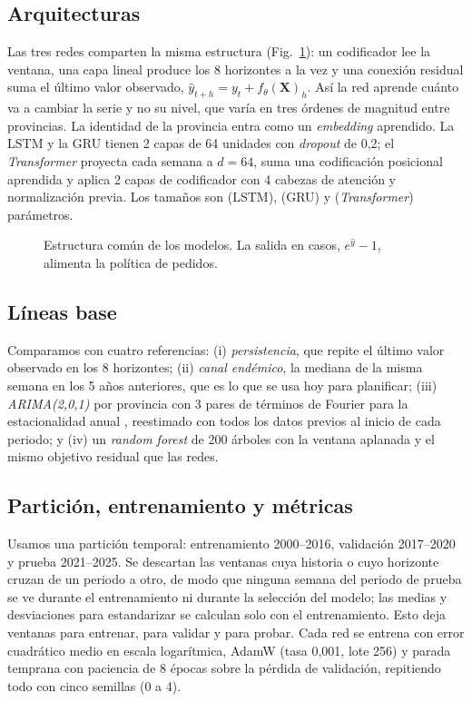 \documentclass[conference,a4paper]{IEEEtran}
\begin{document}
\subsection{Arquitecturas}
Las tres redes comparten la misma estructura (Fig.~\ref{fig:arq}): un codificador lee la ventana, una capa lineal produce los 8 horizontes a la vez y una conexión residual suma el último valor observado, $\hat{y}_{t+h}=y_t+f_\theta(\mathbf{X})_h$. Así la red aprende cuánto va a cambiar la serie y no su nivel, que varía en tres órdenes de magnitud entre provincias. La identidad de la provincia entra como un \textit{embedding} aprendido. La LSTM y la GRU tienen 2 capas de 64 unidades con \textit{dropout} de 0,2; el \textit{Transformer} proyecta cada semana a $d=64$, suma una codificación posicional aprendida y aplica 2 capas de codificador con 4 cabezas de atención y normalización previa. Los tamaños son \nPLS{} (LSTM), \nPGR{} (GRU) y \nPTr{} (\textit{Transformer}) parámetros.

\begin{figure}[t]
\centering

\caption{Estructura común de los modelos. La salida en casos, $e^{\hat y}-1$, alimenta la política de pedidos.}\label{fig:arq}
\end{figure}

\subsection{Líneas base}
Comparamos con cuatro referencias: (i) \emph{persistencia}, que repite el último valor observado en los 8 horizontes; (ii) \emph{canal endémico}, la mediana de la misma semana en los 5 años anteriores, que es lo que se usa hoy para planificar; (iii) \emph{ARIMA(2,0,1)} por provincia con 3 pares de términos de Fourier para la estacionalidad anual \cite{hyndman2021fpp3}, reestimado con todos los datos previos al inicio de cada periodo; y (iv) un \emph{random forest} \cite{breiman2001rf} de 200 árboles con la ventana aplanada y el mismo objetivo residual que las redes.

\subsection{Partición, entrenamiento y métricas}
Usamos una partición temporal: entrenamiento 2000--2016, validación 2017--2020 y prueba 2021--2025. Se descartan las ventanas cuya historia o cuyo horizonte cruzan de un periodo a otro, de modo que ninguna semana del periodo de prueba se ve durante el entrenamiento ni durante la selección del modelo; las medias y desviaciones para estandarizar se calculan solo con el entrenamiento. Esto deja \nnTr{} ventanas para entrenar, \nnVa{} para validar y \nnTe{} para probar. Cada red se entrena con error cuadrático medio en escala logarítmica, AdamW \cite{loshchilov2019adamw} (tasa 0,001, lote 256) y parada temprana con paciencia de 8 épocas sobre la pérdida de validación, repitiendo todo con cinco semillas (0 a 4).
\end{document}
